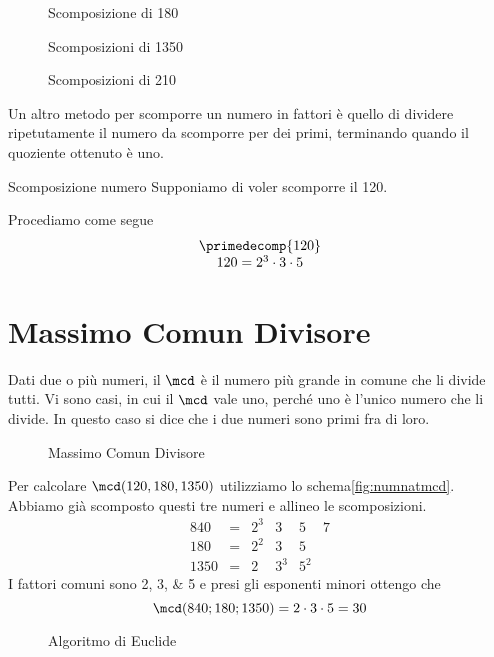 \begin{figure} 
	\centering

	\caption[]{Scomposizione di \num{180}}
	\label{fig:AlberoBinario2}
\end{figure}
\begin{figure} 
\centering

	\caption[]{Scomposizioni di \num{1350}}
	\label{fig:AlberoBinario3}
\end{figure}%
\begin{figure} 
\centering

	\caption[]{Scomposizioni di \num{210}}
	\label{fig:AlberoBinario6}
\end{figure}%
Un altro metodo per scomporre un numero in fattori  è quello di dividere ripetutamente  il numero da scomporre per dei primi, terminando quando il quoziente ottenuto è uno.
\begin{esempiot}{Scomposizione numero}{}
Supponiamo di voler scomporre il \num{120}. 
\end{esempiot}
Procediamo come segue
	\[
	\begin{array}{c}
	\primedecomp{120}\\
	120 =2^3\cdot 3\cdot 5
	\end{array}
	\]

\section{Massimo Comun Divisore}
\label{sec:macdNaturali}
Dati due o più numeri, il $\mcd$ è il numero più grande in comune che li divide tutti. Vi sono casi, in cui il $\mcd$ vale uno, perché uno è l'unico numero che li divide. In questo caso si dice che i due numeri sono primi fra di loro.
 	\begin{figure}
	\centering

	\caption{Massimo Comun Divisore}
	\label{fig:numnatmcd}
\end{figure}
 Per calcolare $\mcd(120,180,1350)$ utilizziamo lo schema\nobs\vref{fig:numnatmcd}. Abbiamo già scomposto questi tre numeri e  	
 allineo le scomposizioni.
   \[
   \begin{array}{rcllll}
   840&= & 2^3 & 3& 5 & 7\\
   180&= & 2^2 & 3& 5 \\
   1350&= & 2 & 3^3& 5^2
   \end{array}
   \]
   I fattori comuni sono \numlist{2;3;5} e presi gli esponenti minori ottengo che
     \[\mcd(840;180;1350)=2\cdot 3\cdot 5=30 \]
    \begin{figure}
    	\centering
    
    	\caption{Algoritmo di Euclide}
    	\label{fig:algoritmoEuclide}
    \end{figure}
   
